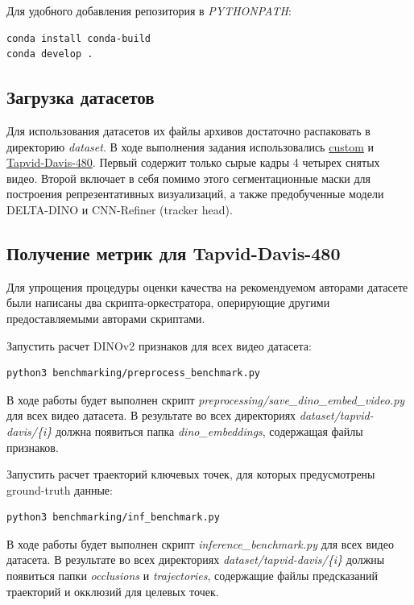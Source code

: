 \documentclass[a4paper, 14pt]{extarticle}
\theoremstyle{definition}
\theoremstyle{plain}
\theoremstyle{remark}
\begin{document}
Для удобного добавления репозитория в \textit{PYTHONPATH}:
\begin{lstlisting}[language=bash]
conda install conda-build
conda develop .
\end{lstlisting}

\subsection{Загрузка датасетов}
Для использования датасетов их файлы архивов достаточно распаковать в директорию \textit{dataset}. В ходе выполнения задания использовались \href{https://drive.google.com/file/d/15iur2U_639eWnykylz69-RPGT6p3Ip8u/view?usp=drive_link}{custom} и \href{https://www.dropbox.com/scl/fo/7s2rgsm92qbzzh2xnx51d/AIvXxRaJPL2RQm43Zi_taJU?e=1&preview=davis_480.zip&rlkey=6cs0bm2u0on1u7z0jyxlq8avq&st=7s75r77a&dl=0}{Tapvid-Davis-480}. Первый содержит только сырые кадры 4 четырех снятых видео. Второй включает в себя помимо этого сегментационные маски для построения репрезентативных визуализаций, а также предобученные модели DELTA-DINO и CNN-Refiner (tracker head).

\subsection{Получение метрик для Tapvid-Davis-480}
Для упрощения процедуры оценки качества на рекомендуемом авторами датасете были написаны два скрипта-оркестратора, оперирующие другими предоставляемыми авторами скриптами.

Запустить расчет DINOv2 признаков для всех видео датасета:
\begin{lstlisting}[language=bash]
python3 benchmarking/preprocess_benchmark.py
\end{lstlisting}
В ходе работы будет выполнен скрипт \textit{preprocessing/save\_dino\_embed\_video.py} для всех видео датасета. В результате во всех директориях \textit{dataset/tapvid-davis/\{i\}} должна появиться папка \textit{dino\_embeddings}, содержащая файлы признаков.

Запустить расчет траекторий ключевых точек, для которых предусмотрены ground-truth данные:
\begin{lstlisting}[language=bash]
python3 benchmarking/inf_benchmark.py
\end{lstlisting}
В ходе работы будет выполнен скрипт \textit{inference\_benchmark.py} для всех видео датасета. В результате во всех директориях \textit{dataset/tapvid-davis/\{i\}} должны появиться папки \textit{occlusions} и \textit{trajectories}, содержащие файлы предсказаний траекторий и окклюзий для целевых точек.
\end{document}
